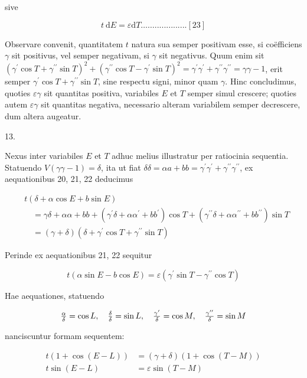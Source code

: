 \documentclass[twoside,12pt, showframe]{memoir}
\let\oldfrac\frac
\def\frac#1#2{\mathchoice{\tfrac{#1}{#2}}{\oldfrac{#1}{#2}}{\genfrac{}{}{}{2}{#1}{#2\mathstrut}}{\genfrac{}{}{}{3}{#1}{#2\mathstrut}}}
\begin{document}
sive

\[
t \mathrm{~d} E=\varepsilon \mathrm{d} T \ldots \ldots . . . . . . . . . . . . . .[23]
\]

Observare convenit, quantitatem \(t\) natura sua semper positivam esse, si coëfficiens \(\gamma\) sit positivus, vel semper negativam, si \(\gamma\) sit negativus. Quum enim sit \(\left(\gamma^{\prime} \cos T+\gamma^{\prime \prime} \sin T\right)^{2}+\left(\gamma^{\prime \prime} \cos T-\gamma^{\prime} \sin T\right)^{2}=\gamma^{\prime} \gamma^{\prime}+\gamma^{\prime \prime} \gamma^{\prime \prime}=\gamma \gamma-1\), erit semper
\(\gamma^{\prime} \cos T+\gamma^{\prime \prime} \sin T\), sine respectu signi, minor quam \(\gamma\). Hinc concludimus, quoties \(\varepsilon \gamma\) sit quantitas positiva, variabiles \(E\) et \(T\) semper simul crescere; quoties autem \(\varepsilon \gamma\) sit quantitas negativa, necessario alteram variabilem semper decrescere, dum altera augeatur.

13.

Nexus inter variabiles \(E\) et \(T\) adhuc melius illustratur per ratiocinia sequentia. Statuendo \(V(\gamma \gamma-1)=\delta\), ita ut fiat \(\delta \delta=\alpha a+b b=\gamma^{\prime} \gamma^{\prime}+\gamma^{\prime \prime} \gamma^{\prime \prime}\), ex aequationibus 20, 21, 22 deducimus

\[
\begin{aligned}
& t(\delta+\alpha \cos E+b \sin E) \\
& \quad=\gamma \delta+\alpha \alpha+b b+\left(\gamma^{\prime} \delta+\alpha \alpha^{\prime}+b b^{\prime}\right) \cos T+\left(\gamma^{\prime \prime} \delta+\alpha \alpha^{\prime \prime}+b b^{\prime \prime}\right) \sin T \\
& \quad=(\gamma+\delta)\left(\delta+\gamma^{\prime} \cos T+\gamma^{\prime \prime} \sin T\right)
\end{aligned}
\]

Perinde ex aequationibus 21, 22 sequitur

\[
t(\alpha \sin E-b \cos E)=\varepsilon\left(\gamma^{\prime} \sin T-\gamma^{\prime \prime} \cos T\right)
\]

Hae aequationes, statuendo

\[
\frac{\alpha}{\delta}=\cos L, \quad \frac{\delta}{\delta}=\sin L, \quad \frac{\gamma^{\prime}}{\delta}=\cos M, \quad \frac{\gamma^{\prime \prime}}{\delta}=\sin M
\]

nanciscuntur formam sequentem:

\[
\begin{aligned}
t(1+\cos (E-L)) & =(\gamma+\delta)(1+\cos (T-M)) \\
t \sin (E-L) & =\varepsilon \sin (T-M)
\end{aligned}
\]
\end{document}
